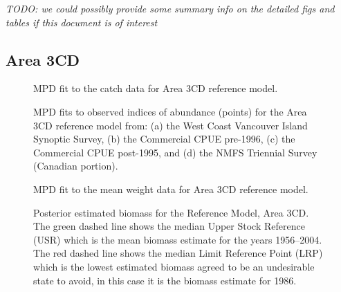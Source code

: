 \documentclass[11pt]{book}
\begin{document}
\emph{TODO: we could possibly provide some summary info on the detailed figs and tables if this document is of interest}

\hypertarget{area-3cd}{%
\subsection{Area 3CD}\label{area-3cd}}
\begin{figure}[htb]

{\centering {} 

}

\caption{MPD fit to the catch data for Area 3CD reference model.}\label{fig:summary-fig-base-catch-fit-3cd}
\end{figure}
\begin{figure}[htb]

{\centering {} 

}

\caption{MPD fits to observed indices of abundance (points) for the Area 3CD reference model from: (a) the West Coast Vancouver Island Synoptic Survey, (b) the Commercial CPUE pre-1996, (c) the Commercial CPUE post-1995, and (d) the NMFS Triennial Survey (Canadian portion).}\label{fig:summary-fig-base-index-fits-3cd}
\end{figure}
\begin{figure}[htb]

{\centering {} 

}

\caption{MPD fit to the mean weight data for Area 3CD reference model.}\label{fig:summary-fig-base-mean-weight-3cd}
\end{figure}
\begin{figure}[htb]

{\centering {} 

}

\caption{Posterior estimated biomass for the Reference Model, Area 3CD. The green dashed line shows the median Upper Stock Reference (USR) which is the mean biomass estimate for the years 1956--2004. The red dashed line shows the median Limit Reference Point (LRP) which is the lowest estimated biomass agreed to be an undesirable state to avoid, in this case it is the biomass estimate for 1986.}\label{fig:summary-fig-base-biomass-3cd}
\end{figure}
\end{document}
